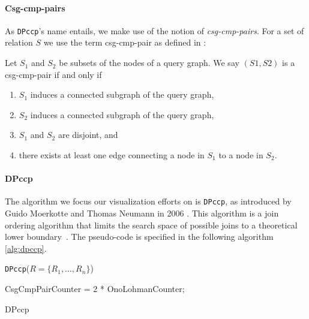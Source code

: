 \paragraph{Csg-cmp-pairs}
As \texttt{DPccp}'s name entails, we make use of the notion of \textit{csg-cmp-pairs}. For a set of relation $S$ we use the term csg-cmp-pair as defined in \cite{moerkotte2006analysis}:
\begin{definition}
    Let $S_1$ and $S_2$ be subsets of the nodes of a query graph. We say $(S1, S2)$ is a csg-cmp-pair if and only if
    \begin{enumerate}
        \item $S_1$ induces a connected subgraph of the query graph,
        \item $S_2$ induces a connected subgraph of the query graph,
        \item $S_1$ and $S_2$ are disjoint, and
        \item there exists at least one edge connecting a node in $S_1$ to a node in $S_2$.
    \end{enumerate}
\end{definition}

\paragraph{DPccp}
The algorithm we focus our visualization efforts on is \texttt{DPccp}, as introduced by Guido Moerkotte and Thomas Neumann in 2006 \cite{moerkotte2006analysis}. This algorithm is a join ordering algorithm that limits the search space of possible joins to a theoretical lower boundary \cite{moerkotte2009building}. 
The pseudo-code is specified in the following algorithm \ref{alg:dpccp}.

\newpage

\texttt{DPccp}($R = \{R_1, \ldots, R_n\}$)

\begin{algorithm}[H]
\BlankLine
{}
CsgCmpPairCounter = 2 * OnoLohmanCounter;\\
\vspace{0.5cm}
\caption{DPccp}
\label{alg:dpccp}
\end{algorithm}
\vspace{0.5cm}

